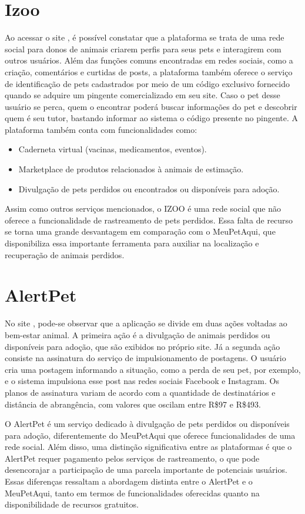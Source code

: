 \section{Izoo }
Ao acessar o site , é possível constatar que a plataforma se trata de uma rede social para donos de animais criarem perfis para seus pets e interagirem com outros usuários. Além das funções comuns encontradas em redes sociais, como a criação, comentários e curtidas de posts, a plataforma também oferece o serviço de identificação de pets cadastrados por meio de um código exclusivo fornecido quando se adquire um pingente comercializado em seu site. Caso o pet desse usuário se perca, quem o encontrar poderá buscar informações do pet e descobrir quem é seu tutor, bastando informar ao sistema o código presente no pingente. A plataforma também conta com funcionalidades como:
\begin{itemize}
\item Caderneta virtual (vacinas, medicamentos, eventos).
\item Marketplace de produtos relacionados à animais de estimação.
\item Divulgação de pets perdidos ou encontrados ou disponíveis para adoção.
\end{itemize}
Assim como outros serviços mencionados, o IZOO é uma rede social que não oferece a funcionalidade de rastreamento de pets perdidos. Essa falta de recurso se torna uma grande desvantagem em comparação com o MeuPetAqui, que disponibiliza essa importante ferramenta para auxiliar na localização e recuperação de animais perdidos.

\section{AlertPet}
No site , pode-se observar que a aplicação se divide em duas ações voltadas ao bem-estar animal. A primeira ação é a divulgação de animais perdidos ou disponíveis para adoção, que são exibidos no próprio site. Já a segunda ação consiste na assinatura do serviço de impulsionamento de postagens. O usuário cria uma postagem informando a situação, como a perda de seu pet, por exemplo, e o sistema impulsiona esse post nas redes sociais Facebook e Instagram. Os planos de assinatura variam de acordo com a quantidade de destinatários e distância de abrangência, com valores que oscilam entre R\$97 e R\$493.

O AlertPet é um serviço dedicado à divulgação de pets perdidos ou disponíveis para adoção, diferentemente do MeuPetAqui que oferece funcionalidades de uma rede social. Além disso, uma distinção significativa entre as plataformas é que o AlertPet requer pagamento pelos serviços de rastreamento, o que pode desencorajar a participação de uma parcela importante de potenciais usuários. Essas diferenças ressaltam a abordagem distinta entre o AlertPet e o MeuPetAqui, tanto em termos de funcionalidades oferecidas quanto na disponibilidade de recursos gratuitos.

